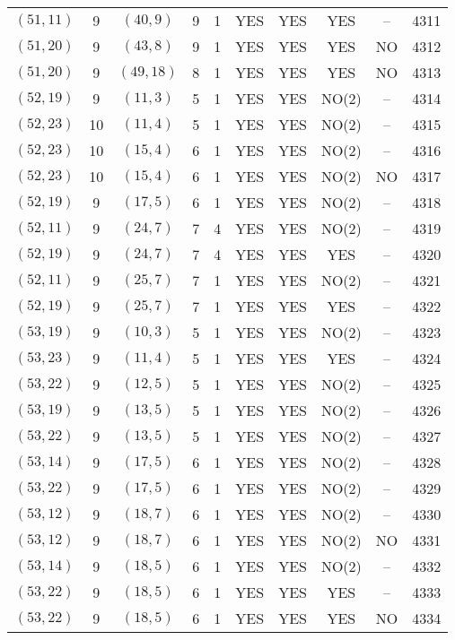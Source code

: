 \begin{longtable}{|c|c|c|c|c|c|c|c|c|c|}
$(51, 11)$ & 9 & $(40, 9)$ & 9 & 1 & YES & YES & YES & -- & 4311\\
$(51, 20)$ & 9 & $(43, 8)$ & 9 & 1 & YES & YES & YES & NO & 4312\\
$(51, 20)$ & 9 & $(49, 18)$ & 8 & 1 & YES & YES & YES & NO & 4313\\
$(52, 19)$ & 9 & $(11, 3)$ & 5 & 1 & YES & YES & NO(2) & -- & 4314\\
$(52, 23)$ & 10 & $(11, 4)$ & 5 & 1 & YES & YES & NO(2) & -- & 4315\\
$(52, 23)$ & 10 & $(15, 4)$ & 6 & 1 & YES & YES & NO(2) & -- & 4316\\
$(52, 23)$ & 10 & $(15, 4)$ & 6 & 1 & YES & YES & NO(2) & NO & 4317\\
$(52, 19)$ & 9 & $(17, 5)$ & 6 & 1 & YES & YES & NO(2) & -- & 4318\\
$(52, 11)$ & 9 & $(24, 7)$ & 7 & 4 & YES & YES & NO(2) & -- & 4319\\
$(52, 19)$ & 9 & $(24, 7)$ & 7 & 4 & YES & YES & YES & -- & 4320\\
$(52, 11)$ & 9 & $(25, 7)$ & 7 & 1 & YES & YES & NO(2) & -- & 4321\\
$(52, 19)$ & 9 & $(25, 7)$ & 7 & 1 & YES & YES & YES & -- & 4322\\
$(53, 19)$ & 9 & $(10, 3)$ & 5 & 1 & YES & YES & NO(2) & -- & 4323\\
$(53, 23)$ & 9 & $(11, 4)$ & 5 & 1 & YES & YES & YES & -- & 4324\\
$(53, 22)$ & 9 & $(12, 5)$ & 5 & 1 & YES & YES & NO(2) & -- & 4325\\
$(53, 19)$ & 9 & $(13, 5)$ & 5 & 1 & YES & YES & NO(2) & -- & 4326\\
$(53, 22)$ & 9 & $(13, 5)$ & 5 & 1 & YES & YES & NO(2) & -- & 4327\\
$(53, 14)$ & 9 & $(17, 5)$ & 6 & 1 & YES & YES & NO(2) & -- & 4328\\
$(53, 22)$ & 9 & $(17, 5)$ & 6 & 1 & YES & YES & NO(2) & -- & 4329\\
$(53, 12)$ & 9 & $(18, 7)$ & 6 & 1 & YES & YES & NO(2) & -- & 4330\\
$(53, 12)$ & 9 & $(18, 7)$ & 6 & 1 & YES & YES & NO(2) & NO & 4331\\
$(53, 14)$ & 9 & $(18, 5)$ & 6 & 1 & YES & YES & NO(2) & -- & 4332\\
$(53, 22)$ & 9 & $(18, 5)$ & 6 & 1 & YES & YES & YES & -- & 4333\\
$(53, 22)$ & 9 & $(18, 5)$ & 6 & 1 & YES & YES & YES & NO & 4334\\

\end{longtable}
